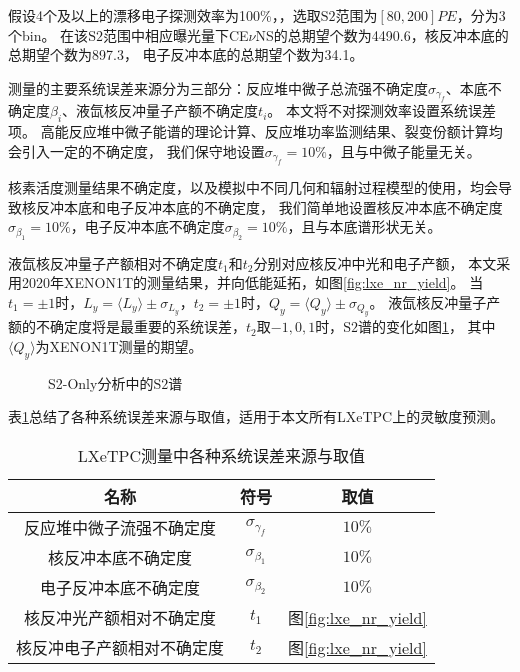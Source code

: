 假设4个及以上的漂移电子探测效率为100\%，，选取$\mathrm{S2}$范围为$[80, 200]\si{PE}$，分为3个bin。
在该$\mathrm{S2}$范围中相应曝光量下CE$\nu$NS的总期望个数为4490.6，核反冲本底的总期望个数为897.3，
电子反冲本底的总期望个数为34.1。

测量的主要系统误差来源分为三部分：反应堆中微子总流强不确定度$\sigma_{\gamma_f}$、本底不确定度$\beta_i$、液氙核反冲量子产额不确定度$t_i$。
本文将不对探测效率设置系统误差项。
高能反应堆中微子能谱的理论计算、反应堆功率监测结果、裂变份额计算均会引入一定的不确定度\cite{an_improved_2017}，
我们保守地设置$\sigma_{\gamma_f}=10\%$，且与中微子能量无关。

核素活度测量结果不确定度，以及模拟中不同几何和辐射过程模型的使用，均会导致核反冲本底和电子反冲本底的不确定度，
我们简单地设置核反冲本底不确定度$\sigma_{\beta_1}=10\%$，电子反冲本底不确定度$\sigma_{\beta_2}=10\%$，且与本底谱形状无关。

液氙核反冲量子产额相对不确定度$t_1$和$t_2$分别对应核反冲中光和电子产额，
本文采用2020年XENON1T的测量结果\cite{aprile_search_2021}，并向低能延拓，如图\ref{fig:lxe_nr_yield}。
当$t_1=\pm1$时，$L_y=\langle L_y\rangle\pm\sigma_{L_y}$，$t_2=\pm1$时，$Q_y=\langle Q_y\rangle\pm\sigma_{Q_y}$。
液氙核反冲量子产额的不确定度将是最重要的系统误差，$t_2$取$-1,0,1$时，$\mathrm{S2}$谱的变化如图\ref{fig:xe_rate_prediction_t2}，
其中$\langle Q_y\rangle$为XENON1T测量的期望。

\begin{figure}
  \centering
  
  \caption{\label{fig:xe_rate_prediction_t2} S2-Only分析中的$\mathrm{S2}$谱}
\end{figure}

表\ref{tab:sys_error}总结了各种系统误差来源与取值，适用于本文所有LXeTPC上的灵敏度预测。

\begin{table}
  \centering
  \caption{LXeTPC测量中各种系统误差来源与取值}
  \begin{tabular}{ccc}
    \toprule
    名称 & 符号 & 取值 \\
    \midrule
    反应堆中微子流强不确定度 & $\sigma_{\gamma_f}$ & $10\%$ \\
    核反冲本底不确定度 & $\sigma_{\beta_1}$ & $10\%$ \\
    电子反冲本底不确定度 & $\sigma_{\beta_2}$ & $10\%$ \\
    核反冲光产额相对不确定度 & $t_1$ & 图\ref{fig:lxe_nr_yield} \\
    核反冲电子产额相对不确定度 & $t_2$ & 图\ref{fig:lxe_nr_yield} \\
    \bottomrule
  \end{tabular}
  \label{tab:sys_error}
\end{table}

